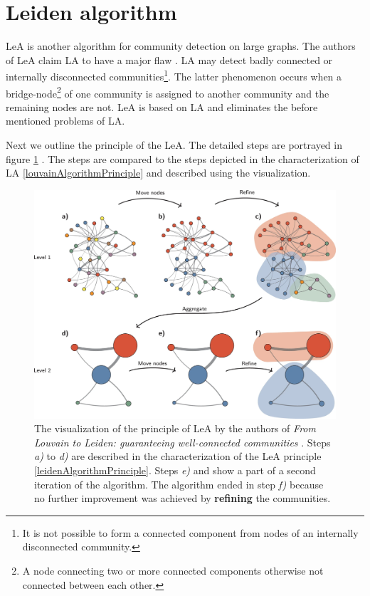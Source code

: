 \section{Leiden algorithm} \label{leidenAlgorithm}
 LeA is another algorithm for community detection on large graphs. The authors of LeA claim LA to have a major flaw \cite{leidenAlgorithm}. LA may detect badly connected or internally disconnected communities\footnote{It is not possible to form a connected component from nodes of an internally disconnected community.}. The latter phenomenon occurs when a bridge-node\footnote{A node connecting two or more connected components otherwise not connected between each other.} of one community is assigned to another community and the remaining nodes are not. LeA is based on LA and eliminates the before mentioned problems of LA. 

Next we outline the principle of the LeA. The detailed steps are portrayed in figure \ref{leidenVisualization} \cite{leidenVisualization}. The steps are compared to the steps depicted in the characterization of LA \ref{louvainAlgorithmPrinciple} and described using the visualization.
\begin{figure}[ht!]
  \centering
  \includegraphics[width=\textwidth]{Images/leidenVisualization.png}
  \caption{The visualization of the principle of LeA \cite{leidenVisualization} by the authors of \textit{From Louvain to Leiden: guaranteeing well-connected communities} \cite{leidenAlgorithm}. Steps \textit{a)} to \textit{d)} are described in the characterization of the LeA principle \ref{leidenAlgorithmPrinciple}. Steps \textit{e)} and  show a part of a second iteration of the algorithm. The algorithm ended in step \textit{f)} because no further improvement was achieved by \textbf{refining} the communities.}
  \label{leidenVisualization}
\end{figure}    
 
